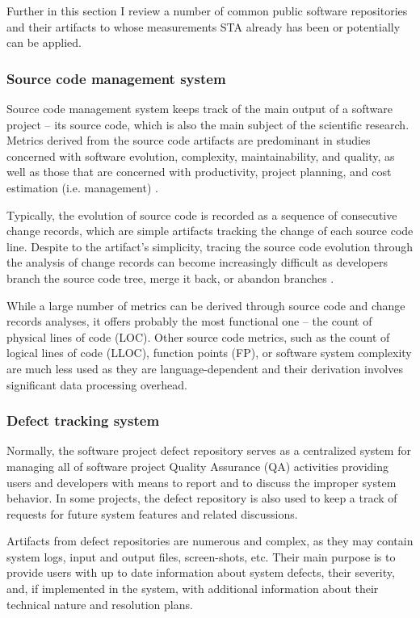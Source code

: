 Further in this section I review a number of common public software repositories and their artifacts to whose measurements 
STA already has been or potentially can be applied. 

\subsubsection{Source code management system}
Source code management system keeps track of the main output of a software project -- its source code, which is also the 
main subject of the scientific research. Metrics derived from the source code artifacts are predominant in studies concerned 
with software evolution, complexity, maintainability, and quality, as well as those that are concerned with productivity, 
project planning, and cost estimation (i.e. management) \cite{citeulike:4534888}. 

Typically, the evolution of source code is recorded as a sequence of consecutive change records, which are simple artifacts
tracking the change of each source code line. Despite to the artifact's simplicity, tracing the source code evolution through 
the analysis of change records can become increasingly difficult as developers branch the source code tree, merge it back, 
or abandon branches \cite{citeulike:13156191}.

While a large number of metrics can be derived through source code and change records analyses, it offers probably 
the most functional one -- the count of physical lines of code (LOC). Other source code metrics, such as the count of logical lines 
of code (LLOC), function points (FP), or software system complexity are much less used as they are language-dependent and their 
derivation involves significant data processing overhead.

\subsubsection{Defect tracking system}
Normally, the software project defect repository serves as a centralized system for managing all of software project 
Quality Assurance (QA) activities providing users and developers with means to report and to discuss the improper system behavior.
In some projects, the defect repository is also used to keep a track of requests for future system features and related
discussions.

Artifacts from defect repositories are numerous and complex, as they may contain system logs, input and output files, 
screen-shots, etc. Their main purpose is to provide users with up to date information about system defects, their severity, 
and, if implemented in the system, with additional information about their technical nature and resolution plans.

